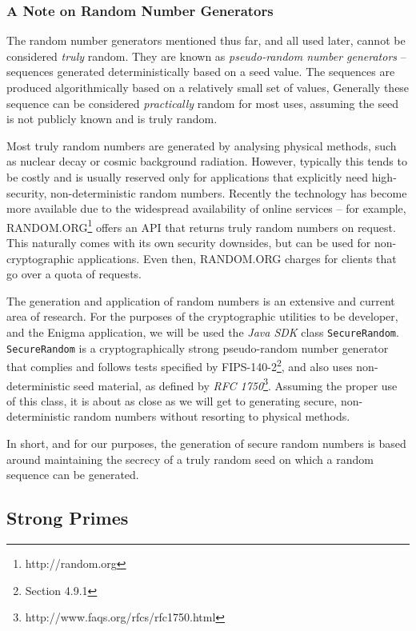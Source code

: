     \subsubsection{A Note on Random Number Generators}
    
    The random number generators mentioned thus far, and all used later, cannot be considered \emph{truly} random. They are known as \emph{pseudo-random number generators} -- sequences generated deterministically based on a seed value. The sequences are produced algorithmically based on a relatively small set of values, Generally these sequence can be considered \emph{practically} random for most uses, assuming the seed is not publicly known and is truly random.
    
    Most truly random numbers are generated by analysing physical methods, such as nuclear decay or cosmic background radiation. However, typically this tends to be costly and is usually reserved only for applications that explicitly need high-security, non-deterministic random numbers. Recently the technology has become more available due to the widespread availability of online services -- for example, RANDOM.ORG\footnote{http://random.org} offers an API that returns truly random numbers on request. This naturally comes with its own security downsides, but can be used for non-cryptographic applications. Even then, RANDOM.ORG charges for clients that go over a quota of requests.
    
    The generation and application of random numbers is an extensive and current area of research. For the purposes of the cryptographic utilities to be developer, and the Enigma application, we will be used the \emph{Java SDK} class \verb!SecureRandom!. \verb!SecureRandom! is a cryptographically strong pseudo-random number generator that complies and follows tests specified by FIPS-140-2\footnote{Section 4.9.1}, and also uses non-deterministic seed material, as defined by \emph{RFC 1750}\footnote{http://www.faqs.org/rfcs/rfc1750.html}. Assuming the proper use of this class, it is about as close as we will get to generating secure, non-deterministic random numbers without resorting to physical methods.
    
    In short, and for our purposes, the generation of secure random numbers is based around maintaining the secrecy of a truly random seed on which a random sequence can be generated.
    
  \subsection{Strong Primes}
  
